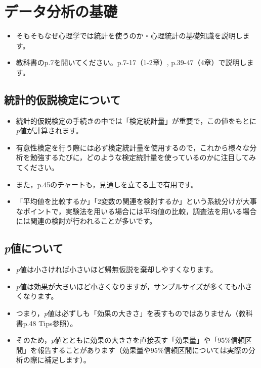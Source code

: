 \documentclass[
]{book}
\providecommand{\tightlist}{%
  \setlength{\itemsep}{0pt}\setlength{\parskip}{0pt}}
\theoremstyle{definition}
\theoremstyle{definition}
\theoremstyle{definition}
\theoremstyle{definition}
\theoremstyle{remark}
\begin{document}
\hypertarget{ux30c7ux30fcux30bfux5206ux6790ux306eux57faux790e}{%
\section{データ分析の基礎}\label{ux30c7ux30fcux30bfux5206ux6790ux306eux57faux790e}}

\begin{itemize}
\tightlist
\item
  そもそもなぜ心理学では統計を使うのか・心理統計の基礎知識を説明します。
\item
  教科書のp.7を開いてください。p.7-17（1-2章）, p.39-47（4章）で説明します。
\end{itemize}

\hypertarget{ux7d71ux8a08ux7684ux4eeeux8aacux691cux5b9aux306bux3064ux3044ux3066}{%
\subsection{統計的仮説検定について}\label{ux7d71ux8a08ux7684ux4eeeux8aacux691cux5b9aux306bux3064ux3044ux3066}}

\begin{itemize}
\tightlist
\item
  統計的仮説検定の手続きの中では「検定統計量」が重要で，この値をもとに\emph{p}値が計算されます。
\item
  有意性検定を行う際には必ず検定統計量を使用するので，これから様々な分析を勉強するたびに，どのような検定統計量を使っているのかに注目してみてください。
\item
  また，p.45のチャートも，見通しを立てる上で有用です。
\item
  「平均値を比較するか」「2変数の関連を検討するか」という系統分けが大事なポイントで，実験法を用いる場合には平均値の比較，調査法を用いる場合には関連の検討が行われることが多いです。
\end{itemize}

\hypertarget{pux5024ux306bux3064ux3044ux3066}{%
\subsection{\texorpdfstring{\emph{p}値について}{p値について}}\label{pux5024ux306bux3064ux3044ux3066}}

\begin{itemize}
\tightlist
\item
  \emph{p}値は小さければ小さいほど帰無仮説を棄却しやすくなります。
\item
  \emph{p}値は効果が大きいほど小さくなりますが，サンプルサイズが多くても小さくなります。
\item
  つまり，\emph{p}値は必ずしも「効果の大きさ」を表すものではありません（教科書p.48 Tips参照）。
\item
  そのため，\emph{p}値とともに効果の大きさを直接表す「効果量」や「95\%信頼区間」を報告することがあります（効果量や95\%信頼区間については実際の分析の際に補足します）。
\end{itemize}
\end{document}
